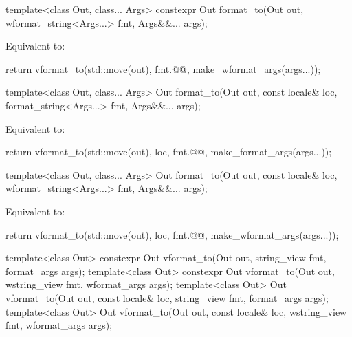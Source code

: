 %
\begin{itemdecl}
template<class Out, class... Args>
  constexpr Out format_to(Out out, wformat_string<Args...> fmt, Args&&... args);
\end{itemdecl}

\begin{itemdescr}
\pnum
\effects
Equivalent to:
\begin{codeblock}
return vformat_to(std::move(out), fmt.@@, make_wformat_args(args...));
\end{codeblock}
\end{itemdescr}

%
\begin{itemdecl}
template<class Out, class... Args>
  Out format_to(Out out, const locale& loc, format_string<Args...>  fmt, Args&&... args);
\end{itemdecl}

\begin{itemdescr}
\pnum
\effects
Equivalent to:
\begin{codeblock}
return vformat_to(std::move(out), loc, fmt.@@, make_format_args(args...));
\end{codeblock}
\end{itemdescr}

%
\begin{itemdecl}
template<class Out, class... Args>
  Out format_to(Out out, const locale& loc, wformat_string<Args...> fmt, Args&&... args);
\end{itemdecl}

\begin{itemdescr}
\pnum
\effects
Equivalent to:
\begin{codeblock}
return vformat_to(std::move(out), loc, fmt.@@, make_wformat_args(args...));
\end{codeblock}
\end{itemdescr}

%
\begin{itemdecl}
template<class Out>
  constexpr Out vformat_to(Out out, string_view fmt, format_args args);
template<class Out>
  constexpr Out vformat_to(Out out, wstring_view fmt, wformat_args args);
template<class Out>
  Out vformat_to(Out out, const locale& loc, string_view fmt, format_args args);
template<class Out>
  Out vformat_to(Out out, const locale& loc, wstring_view fmt, wformat_args args);
\end{itemdecl}

